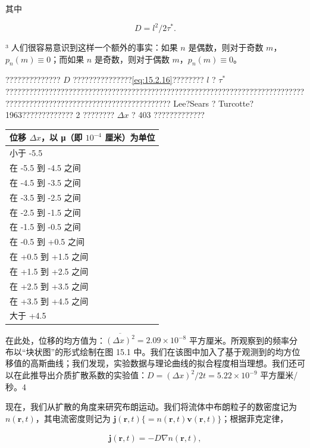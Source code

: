 其中

\begin{equation}\tag{15.2.17}\label{eq:15.2.17}
D = l ^{2} / 2 \tau ^{*} .
\end{equation}

³ 人们很容易意识到这样一个额外的事实：如果 \(n\) 是偶数，则对于奇数 \(m\)，\(p_{n}(m) \equiv 0\)；而如果 \(n\) 是奇数，则对于偶数 \(m\)，\(p_{n}(m) \equiv 0\)。

?????????????? \(D\) ???????????????\autoref{eq:15.2.16}???????? \(l\) ? \(\tau^*\) ?????????????????????????????????????????????????????????????????????????????????????????????????????????????????????? Lee?Sears ? Turcotte?1963????????????? 2 ???????? \(\Delta x\) ? 403 ?????????????

\begin{longtable}[]{@{}l@{}}
\toprule\noalign{}
位移 \(\Delta x\)，以 μ（即 \(10^{-4}\) 厘米）为单位 \\
\midrule\noalign{}
\endhead
\bottomrule\noalign{}
\endlastfoot
小于 -5.5 \\
在 -5.5 到 -4.5 之间 \\
在 -4.5 到 -3.5 之间 \\
在 -3.5 到 -2.5 之间 \\
在 -2.5 到 -1.5 之间 \\
在 -1.5 到 -0.5 之间 \\
在 -0.5 到 +0.5 之间 \\
在 +0.5 到 +1.5 之间 \\
在 +1.5 到 +2.5 之间 \\
在 +2.5 到 +3.5 之间 \\
在 +3.5 到 +4.5 之间 \\
大于 +4.5 \\
\end{longtable}

在此处，位移的均方值为：\(\overline{(\Delta x)^2} = 2.09 \times 10^{-8}\) 平方厘米。所观察到的频率分布以``块状图''的形式绘制在图 15.1 中。我们在该图中加入了基于观测到的均方位移值的高斯曲线；我们发现，实验数据与理论曲线的拟合程度相当理想。我们还可以在此推导出介质扩散系数的实验值：\(D = (\Delta x)^2/2t = 5.22 \times 10^{-9}\) 平方厘米/秒。4

现在，我们从扩散的角度来研究布朗运动。我们将流体中布朗粒子的数密度记为 \(n(\boldsymbol{r},t)\)，其电流密度则记为 \(\boldsymbol{j}(\boldsymbol{r},t)\{=n(\boldsymbol{r},t)\boldsymbol{v}(\boldsymbol{r},t)\}\)；根据菲克定律，

\begin{equation}\tag{15.2.18}\label{eq:15.2.18}
\begin{array}{r} { \mathbf { j } ( \mathbf { r } , t ) = - D \nabla n ( \mathbf { r } , t ) , } \end{array}
\end{equation}

